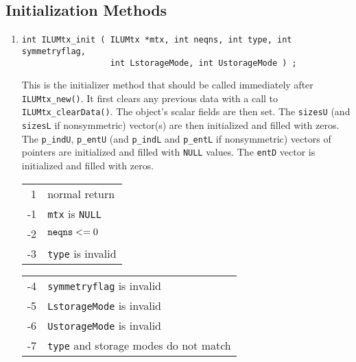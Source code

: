 \subsection{Initialization Methods}
\label{subsection:ILUMtx:proto:initializers}
\par
\begin{enumerate}
\item
\begin{verbatim}
int ILUMtx_init ( ILUMtx *mtx, int neqns, int type, int symmetryflag,
                  int LstorageMode, int UstorageMode ) ;
\end{verbatim}
This is the initializer method that should be called immediately
after {\tt ILUMtx\_new()}.
It first clears any previous data with a call to 
{\tt ILUMtx\_clearData()}.
The object's scalar fields are then set.
The {\tt sizesU} (and {\tt sizesL} if nonsymmetric) vector(s) are
then initialized and filled with zeros.
The {\tt p\_indU}, {\tt p\_entU}
(and {\tt p\_indL} and {\tt p\_entL} if nonsymmetric)
vectors of pointers are initialized and filled with {\tt NULL}
values.
The {\tt entD} vector is initialized and filled with zeros.
\par {}
\begin{center}
\begin{tabular}{rl}
 1 & normal return \\
-1 & {\tt mtx} is {\tt NULL} \\
-2 & ${\tt neqns} <= 0$ \\
-3 & {\tt type} is invalid \\
\end{tabular}
\quad
\begin{tabular}{rl}
-4 & {\tt symmetryflag} is invalid \\
-5 & {\tt LstorageMode} is invalid \\
-6 & {\tt UstorageMode} is invalid \\
-7 & {\tt type} and storage modes do not match
\end{tabular}
\end{center}
\end{enumerate}
\par
\par
